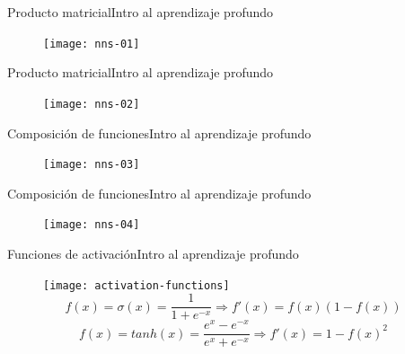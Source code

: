 \documentclass[10pt,border=3pt,tikz]{beamer}
\begin{document}
    \begin{frame}{Producto matricial}{Intro al aprendizaje profundo}
        \begin{figure}
            \centering
            \texttt{[image: nns-01]}
        \end{figure}
    \end{frame}
    
    \begin{frame}{Producto matricial}{Intro al aprendizaje profundo}
        \begin{figure}
            \centering
            \texttt{[image: nns-02]}
        \end{figure}
    \end{frame}
    
    \begin{frame}{Composición de funciones}{Intro al aprendizaje profundo}
        \begin{figure}
            \centering
            \texttt{[image: nns-03]}
        \end{figure}
    \end{frame}
    
    \begin{frame}{Composición de funciones}{Intro al aprendizaje profundo}
        \begin{figure}
            \centering
            \texttt{[image: nns-04]}
        \end{figure}
    \end{frame}

    \begin{frame}{Funciones de activación}{Intro al aprendizaje profundo}
        \begin{figure}
            \centering
            \texttt{[image: activation-functions]}
            $$f(x) = \sigma(x) = \dfrac{1}{1 + e^{-x}} \Rightarrow f'(x) = f(x)(1 - f(x))$$
            $$f(x) = tanh(x) = \dfrac{e^x - e^{-x}}{e^x + e^{-x}} \Rightarrow f'(x) = 1 - f(x)^2$$
        \end{figure}
    \end{frame}
    
\end{document}
